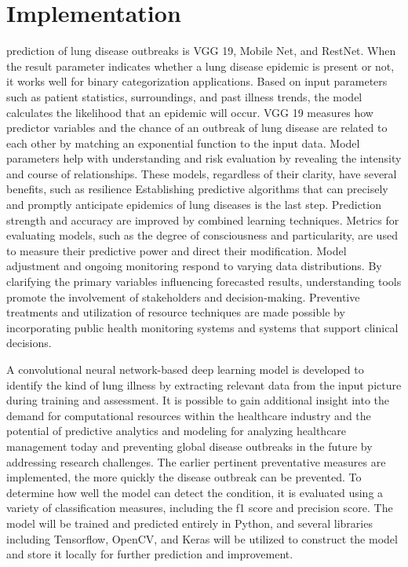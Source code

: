 \section {Implementation}
prediction of lung disease outbreaks is VGG 19, Mobile Net, and RestNet. When the result parameter indicates whether a lung disease epidemic is present or not, it works well for binary categorization applications. Based on input parameters such as patient statistics, surroundings, and past illness trends, the model calculates the likelihood that an epidemic will occur. VGG 19 measures how predictor variables and the chance of an outbreak of lung disease are related to each other by matching an exponential function to the input data. Model parameters help with understanding and risk evaluation by revealing the intensity and course of relationships. These models, regardless of their clarity, have several benefits, such as resilience Establishing predictive algorithms that can precisely and promptly anticipate epidemics of lung diseases is the last step. Prediction strength and accuracy are improved by combined learning techniques. Metrics for evaluating models, such as the degree of consciousness and particularity, are used to measure their predictive power and direct their modification. Model adjustment and ongoing monitoring respond to varying data distributions. By clarifying the primary variables influencing forecasted results, understanding tools promote the involvement of stakeholders and decision-making. Preventive treatments and utilization of resource techniques are made possible by incorporating public health monitoring systems and systems that support clinical decisions.

A convolutional neural network-based deep learning model is developed to identify the kind of lung illness by extracting relevant data from the input picture during training and assessment. It is possible to gain additional insight into the demand for computational resources within the healthcare industry and the potential of predictive analytics and modeling for analyzing healthcare management today and preventing global disease outbreaks in the future by addressing research challenges. The earlier pertinent preventative measures are implemented, the more quickly the disease outbreak can be prevented. To determine how well the model can detect the condition, it is evaluated using a variety of classification measures, including the f1 score and precision score. The model will be trained and predicted entirely in Python, and several libraries including Tensorflow, OpenCV, and Keras will be utilized to construct the model and store it locally for further prediction and improvement. 

